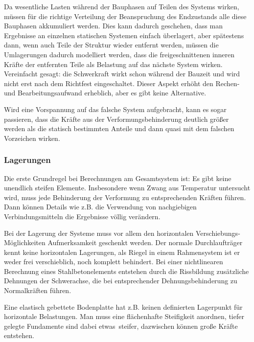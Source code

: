 Da wesentliche Lasten w\"{a}hrend der Bauphasen auf Teilen des Systems wirken, m\"{u}ssen f\"{u}r die richtige Verteilung der Beanspruchung des Endzustands alle diese Bauphasen akkumuliert werden. Dies kann dadurch geschehen, dass man Ergebnisse an einzelnen statischen Systemen einfach \"{u}berlagert, aber sp\"{a}testens dann, wenn auch Teile der Struktur wieder entfernt werden, m\"{u}ssen die Umlagerungen dadurch modelliert werden, dass die freigeschnittenen inneren Kr\"{a}fte der entfernten Teile als Belastung auf das n\"{a}chste System wirken. Vereinfacht gesagt: die Schwerkraft wirkt schon w\"{a}hrend der Bauzeit und wird nicht erst nach dem Richtfest eingeschaltet. Dieser Aspekt erh\"{o}ht den Rechen- und Bearbeitungsaufwand erheblich, aber es gibt keine Alternative.

Wird eine Vorspannung auf das falsche System aufgebracht, kann es sogar passieren, dass die Kr\"{a}fte aus der Verformungsbehinderung deutlich gr\"{o}{\ss}er werden als die statisch bestimmten Anteile und dann quasi mit dem falschen Vorzeichen wirken.

{\textcolor{sectionTitleBlue}{\subsubsection*{Lagerungen}}}

Die erste Grundregel bei Berechnungen am Gesamtsystem ist: \glq Es gibt keine unendlich steifen Elemente\grq. Insbesondere wenn Zwang aus Temperatur untersucht wird, muss jede Behinderung der Verformung zu entsprechenden Kr\"{a}ften f\"{u}hren. Dann k\"{o}nnen Details wie z.B. die Verwendung von nachgiebigen Verbindungsmitteln die Ergebnisse v\"{o}llig ver\"{a}ndern.

Bei der Lagerung der Systeme muss vor allem den horizontalen Verschiebungs-M\"{o}glichkeiten Aufmerksamkeit geschenkt werden. Der normale Durchlauftr\"{a}ger kennt keine horizontalen Lagerungen, als Riegel in einem Rahmensystem ist er weder frei verschieblich, noch komplett behindert. Bei einer nichtlinearen Berechnung eines Stahlbetonelements entstehen durch die Rissbildung zus\"{a}tzliche Dehnungen der Schwerachse, die bei entsprechender Dehnungsbehinderung zu Normalkr\"{a}ften f\"{u}hren.

Eine elastisch gebettete Bodenplatte hat z.B. keinen definierten Lagerpunkt f\"{u}r horizontale Belastungen. Man muss eine fl\"{a}chenhafte Steifigkeit anordnen, tiefer gelegte Fundamente sind dabei \glq etwas\grq\ steifer, dazwischen k\"{o}nnen gro{\ss}e Kr\"{a}fte entstehen.

